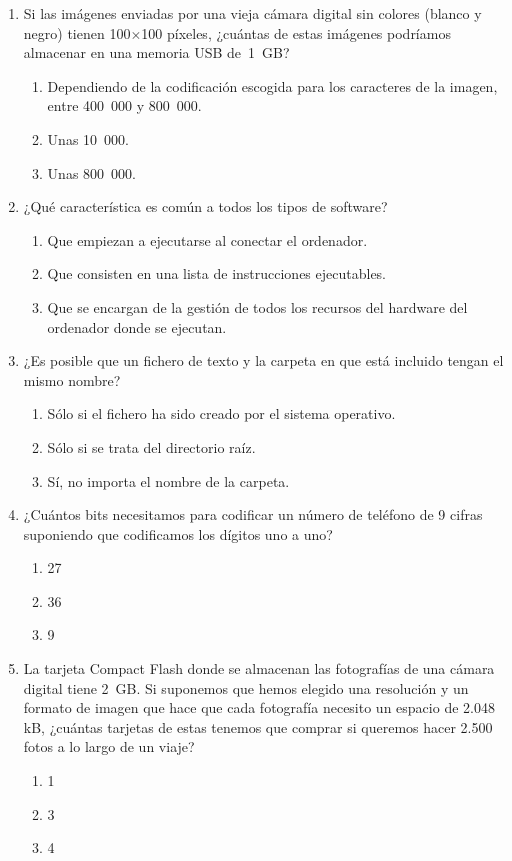 \begin{enumerate}
\item Si las imágenes enviadas por una vieja cámara digital sin colores (blanco y negro) tienen 100$\times$100 píxeles, ¿cuántas de estas imágenes podríamos almacenar en una memoria USB de~1~GB? \begin{enumerate} \item Dependiendo de la codificación escogida para los caracteres de la imagen, entre 400~000 y 800~000. \item Unas 10~000. \item Unas 800~000. \end{enumerate} 

\item ¿Qué característica es común a todos los tipos de software? \begin{enumerate} \item Que empiezan a ejecutarse al conectar el ordenador. \item Que consisten en una lista de instrucciones ejecutables. \item Que se encargan de la gestión de todos los recursos del hardware del ordenador donde se ejecutan. \end{enumerate} 

\item ¿Es posible que un fichero de texto y la carpeta en que está incluido tengan el mismo nombre? \begin{enumerate} \item Sólo si el fichero ha sido creado por el sistema operativo. \item Sólo si se trata del directorio raíz. \item Sí, no importa el nombre de la carpeta. \end{enumerate} 

\item ¿Cuántos bits necesitamos para codificar un número de teléfono de 9 cifras suponiendo que codificamos los dígitos uno a uno? \begin{enumerate} \item 27 \item 36 \item 9 \end{enumerate} 

\item La tarjeta Compact Flash donde se almacenan las fotografías de una cámara digital tiene 2~GB. Si suponemos que hemos elegido una resolución y un formato de imagen que hace que cada fotografía necesito un espacio de 2.048 kB, ¿cuántas tarjetas de estas tenemos que comprar si queremos hacer 2.500 fotos a lo largo de un viaje? \begin{enumerate} \item 1 \item 3 \item 4 \end{enumerate} 


\end{enumerate}
